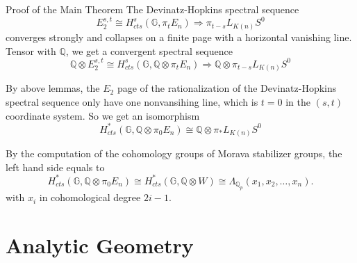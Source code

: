\documentclass[aspectratio=1610]{ctexbeamer}
\def  \bq       {\mathbb{Q}}
\begin{document}
\begin{frame}{Proof of the Main Theorem}
	The Devinatz-Hopkins spectral sequence
	$$
		E_2^{s,t} \cong H^{s}_{cts}(\mathbb{G},  \pi_tE_n) \Longrightarrow \pi_{t-s}L_{K(n)} S^0 
	$$
	converges strongly and collapses on a finite page with a horizontal vanishing line. Tensor with $\bq$, we get a convergent spectral sequence
	$$
	\bq \otimes E^{s,t}_2  \cong H^{s}_{cts}(\mathbb{G},  \bq \otimes  \pi_tE_n) \Longrightarrow   \bq \otimes \pi_{t-s}L_{K(n)} S^0 
	$$
	

	By  above lemmas, the  $E_2$  page of the rationalization of the Devinatz-Hopkins spectral sequence only have one  nonvansihing line, which is   $t=0$ in the $(s,t)$ coordinate system. So we get an isomorphism
	$$
	 H^{*}_{cts}(\mathbb{G},  \bq \otimes \pi_0E_n) \cong   \bq \otimes \pi_{*}L_{K(n)} S^0 
	$$

	By the computation of the  cohomology groups of Morava stabilizer groups, the left hand side equals to
	$$
	 H^{*}_{cts}(\mathbb{G},  \bq \otimes \pi_0E_n) \cong  H^{*}_{cts}(\mathbb{G},  \bq \otimes W)  \cong \Lambda_{\bq_p}(x_1, x_2, \dots,  x_n).
	$$
	with $x_i$ in cohomological degree $2i-1$.	
\end{frame}












\section{Analytic Geometry}
\end{document}

